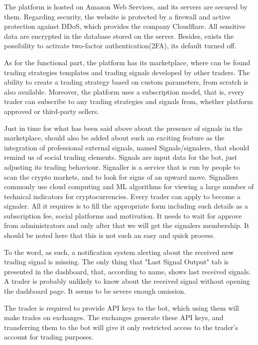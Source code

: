 \documentclass[thesis=B,english]{FITthesis}[2019/03/06]
\begin{document}
The platform is hosted on Amazon Web Services, and its servers are secured by them. Regarding security, the website is protected by a firewall and active protection against DDoS, which provides the company Cloudflare. All sensitive data are encrypted in the database stored on the server. Besides, exists the possibility to activate two-factor authentication(2FA), its default turned off. 

As for the functional part, the platform has its marketplace, where can be found trading strategies templates and trading signals developed by other traders. The ability to create a trading strategy based on custom parameters, from scratch is also available. Moreover, the platform uses a subscription model, that is, every trader can subscribe to any trading strategies and signals from, whether platform approved or third-party sellers.

Just in time for what has been said above about the presence of signals in the marketplace,  should also be added about such an exciting feature as the integration of professional external signals, named Signals/signalers, that should remind us of social trading elements. Signals are input data for the bot, just adjusting its trading behaviour. Signaller is a service that is run by people to scan the crypto markets, and to look for signs of an upward move. Signallers commonly use cloud computing and  ML algorithms for viewing a large number of technical indicators for cryptocurrencies. Every trader can apply to become a signaler. All it requires is to fill the appropriate form including such details as a subscription fee, social platforms and motivation. It needs to wait for approve from administrators and only after that we will get the signalers membership. It should be noted here that this is not such an easy and quick process.

To the word, as such, a notification system alerting about the received new trading signal is missing. The only thing that "Last Signal Output" tab is presented in the dashboard, that, according to name, shows last received signals. A trader is probably unlikely to know about the received signal without opening the dashboard page. It seems to be severe enough omission.

The trader is required to provide API keys to the bot, which using them will make trades on exchanges. The exchanges generate these API keys, and transferring them to the bot will give it only restricted access to the trader's account for trading purposes.
\end{document}
